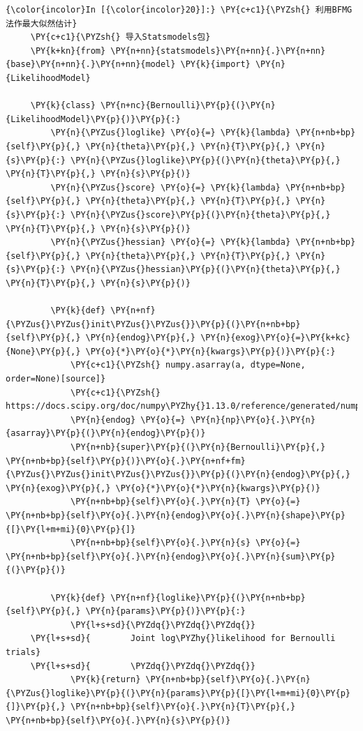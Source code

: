 \begin{Verbatim}[commandchars=\\\{\}]
{\color{incolor}In [{\color{incolor}20}]:} \PY{c+c1}{\PYZsh{} 利用BFMG法作最大似然估计}
     \PY{c+c1}{\PYZsh{} 导入Statsmodels包}
     \PY{k+kn}{from} \PY{n+nn}{statsmodels}\PY{n+nn}{.}\PY{n+nn}{base}\PY{n+nn}{.}\PY{n+nn}{model} \PY{k}{import} \PY{n}{LikelihoodModel}

     \PY{k}{class} \PY{n+nc}{Bernoulli}\PY{p}{(}\PY{n}{LikelihoodModel}\PY{p}{)}\PY{p}{:}
         \PY{n}{\PYZus{}loglike} \PY{o}{=} \PY{k}{lambda} \PY{n+nb+bp}{self}\PY{p}{,} \PY{n}{theta}\PY{p}{,} \PY{n}{T}\PY{p}{,} \PY{n}{s}\PY{p}{:} \PY{n}{\PYZus{}loglike}\PY{p}{(}\PY{n}{theta}\PY{p}{,} \PY{n}{T}\PY{p}{,} \PY{n}{s}\PY{p}{)}
         \PY{n}{\PYZus{}score} \PY{o}{=} \PY{k}{lambda} \PY{n+nb+bp}{self}\PY{p}{,} \PY{n}{theta}\PY{p}{,} \PY{n}{T}\PY{p}{,} \PY{n}{s}\PY{p}{:} \PY{n}{\PYZus{}score}\PY{p}{(}\PY{n}{theta}\PY{p}{,} \PY{n}{T}\PY{p}{,} \PY{n}{s}\PY{p}{)}
         \PY{n}{\PYZus{}hessian} \PY{o}{=} \PY{k}{lambda} \PY{n+nb+bp}{self}\PY{p}{,} \PY{n}{theta}\PY{p}{,} \PY{n}{T}\PY{p}{,} \PY{n}{s}\PY{p}{:} \PY{n}{\PYZus{}hessian}\PY{p}{(}\PY{n}{theta}\PY{p}{,} \PY{n}{T}\PY{p}{,} \PY{n}{s}\PY{p}{)}

         \PY{k}{def} \PY{n+nf}{\PYZus{}\PYZus{}init\PYZus{}\PYZus{}}\PY{p}{(}\PY{n+nb+bp}{self}\PY{p}{,} \PY{n}{endog}\PY{p}{,} \PY{n}{exog}\PY{o}{=}\PY{k+kc}{None}\PY{p}{,} \PY{o}{*}\PY{o}{*}\PY{n}{kwargs}\PY{p}{)}\PY{p}{:}
             \PY{c+c1}{\PYZsh{} numpy.asarray(a, dtype=None, order=None)[source]}
             \PY{c+c1}{\PYZsh{} https://docs.scipy.org/doc/numpy\PYZhy{}1.13.0/reference/generated/numpy.asarray.html}
             \PY{n}{endog} \PY{o}{=} \PY{n}{np}\PY{o}{.}\PY{n}{asarray}\PY{p}{(}\PY{n}{endog}\PY{p}{)}
             \PY{n+nb}{super}\PY{p}{(}\PY{n}{Bernoulli}\PY{p}{,} \PY{n+nb+bp}{self}\PY{p}{)}\PY{o}{.}\PY{n+nf+fm}{\PYZus{}\PYZus{}init\PYZus{}\PYZus{}}\PY{p}{(}\PY{n}{endog}\PY{p}{,} \PY{n}{exog}\PY{p}{,} \PY{o}{*}\PY{o}{*}\PY{n}{kwargs}\PY{p}{)}
             \PY{n+nb+bp}{self}\PY{o}{.}\PY{n}{T} \PY{o}{=} \PY{n+nb+bp}{self}\PY{o}{.}\PY{n}{endog}\PY{o}{.}\PY{n}{shape}\PY{p}{[}\PY{l+m+mi}{0}\PY{p}{]}
             \PY{n+nb+bp}{self}\PY{o}{.}\PY{n}{s} \PY{o}{=} \PY{n+nb+bp}{self}\PY{o}{.}\PY{n}{endog}\PY{o}{.}\PY{n}{sum}\PY{p}{(}\PY{p}{)}

         \PY{k}{def} \PY{n+nf}{loglike}\PY{p}{(}\PY{n+nb+bp}{self}\PY{p}{,} \PY{n}{params}\PY{p}{)}\PY{p}{:}
             \PY{l+s+sd}{\PYZdq{}\PYZdq{}\PYZdq{}}
     \PY{l+s+sd}{        Joint log\PYZhy{}likelihood for Bernoulli trials}
     \PY{l+s+sd}{        \PYZdq{}\PYZdq{}\PYZdq{}}
             \PY{k}{return} \PY{n+nb+bp}{self}\PY{o}{.}\PY{n}{\PYZus{}loglike}\PY{p}{(}\PY{n}{params}\PY{p}{[}\PY{l+m+mi}{0}\PY{p}{]}\PY{p}{,} \PY{n+nb+bp}{self}\PY{o}{.}\PY{n}{T}\PY{p}{,} \PY{n+nb+bp}{self}\PY{o}{.}\PY{n}{s}\PY{p}{)}


\end{Verbatim}
